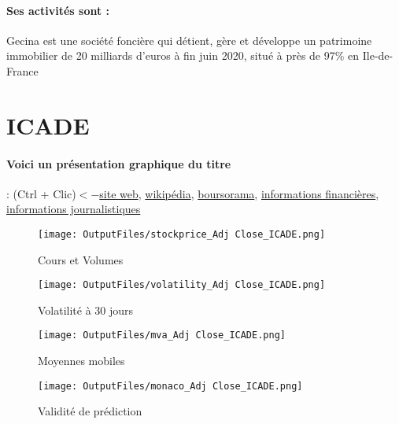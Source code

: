 \documentclass[11pt,a4paper]{report}%
\begin{document}
\paragraph{Ses activités sont : } Gecina est une société foncière qui détient, gère et développe un patrimoine immobilier de 20 milliards d’euros à fin juin 2020, situé à près de 97\% en Ile-de-France 
    
    \newpage

\section{ICADE}

\paragraph{Voici un présentation graphique du titre} : (Ctrl + Clic)$<-$\href{https://www.icade.fr/finance/resultats-financiers}{site web}, \href{https://fr.wikipedia.org/wiki/Icade}{wikipédia}, \href{https://www.boursorama.com/cours/1rPICAD}{boursorama}, \href{https://www.qwant.com/?q=site:https:%2f%2fwww.easybourse.com%2faction-societe%2fICADE&t=web&client=ext-firefox-hp}{informations financières}, \href{https://bourse.lerevenu.com/cours-de-bourse/fiche-valeur-synthese/ICADE/ICAD-FR}{informations journalistiques}
\begin{figure}[!htb]
   \begin{minipage}{0.5\textwidth}
     \centering
     \texttt{[image: OutputFiles/stockprice\_Adj Close\_ICADE.png]}
     \caption{Cours et Volumes}\label{Fig:price_ICADE}
   \end{minipage}\hfill
   \begin{minipage}{0.5\textwidth}
     \centering
     \texttt{[image: OutputFiles/volatility\_Adj Close\_ICADE.png]}
     \caption{Volatilité à 30 jours}\label{Fig:volat_ICADE}
   \end{minipage}
\end{figure}
\begin{figure}[!htb]
   \begin{minipage}{0.5\textwidth}
     \centering
     \texttt{[image: OutputFiles/mva\_Adj Close\_ICADE.png]}
     \caption{Moyennes mobiles}\label{Fig:mva_ICADE}
   \end{minipage}\hfill
   \begin{minipage}{0.5\textwidth}
     \centering
     \texttt{[image: OutputFiles/monaco\_Adj Close\_ICADE.png]}
     \caption{Validité de prédiction}\label{Fig:prediction_ICADE}
   \end{minipage}
\end{figure}
\end{document}
